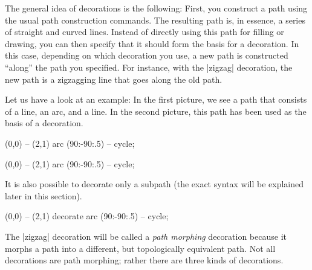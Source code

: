 \begin{codeexample}[pre={\pgfmathsetseed{1}},preamble={\usetikzlibrary{decorations.pathmorphing}}]
\end{codeexample}

The general idea of decorations is the following: First, you construct a path
using the usual path construction commands. The resulting path is, in essence,
a series of straight and curved lines. Instead of directly using this path for
filling or drawing, you can then specify that it should form the basis for a
decoration. In this case, depending on which decoration you use, a new path is
constructed ``along'' the path you specified. For instance, with the |zigzag|
decoration, the new path is a zigzagging line that goes along the old path.

Let us have a look at an example: In the first picture, we see a path that
consists of a line, an arc, and a line. In the second picture, this path has
been used as the basis of a decoration.
%
\begin{codeexample}[preamble={\usetikzlibrary{decorations.pathmorphing}}]
\tikz \fill
  [fill=blue!20,draw=blue,thick] (0,0) -- (2,1) arc (90:-90:.5) -- cycle;
\end{codeexample}
%
\begin{codeexample}[preamble={\usetikzlibrary{decorations.pathmorphing}}]
\tikz \fill [decorate,decoration={zigzag}]
  [fill=blue!20,draw=blue,thick] (0,0) -- (2,1) arc (90:-90:.5) -- cycle;
\end{codeexample}

It is also possible to decorate only a subpath (the exact syntax will be
explained later in this section).
%
\begin{codeexample}[preamble={\usetikzlibrary{decorations.pathmorphing}}]
\tikz \fill [decoration={zigzag}]
  [fill=blue!20,draw=blue,thick] (0,0) -- (2,1)
    decorate { arc (90:-90:.5) } -- cycle;
\end{codeexample}

The |zigzag| decoration will be called a \emph{path morphing} decoration
because it morphs a path into a different, but topologically equivalent path.
Not all decorations are path morphing; rather there are three kinds of
decorations.

